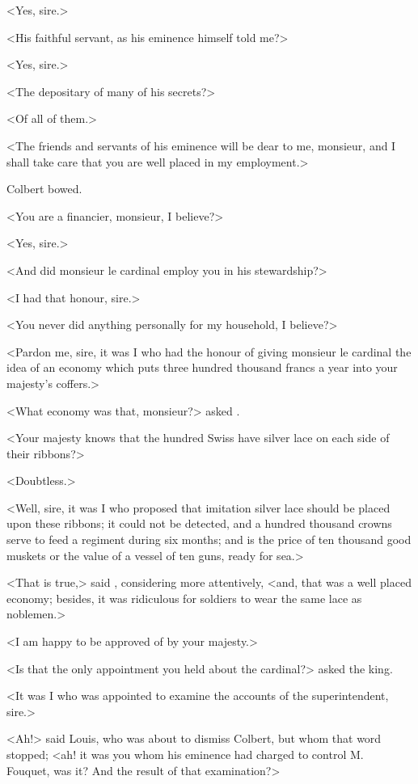 <Yes, sire.>

<His faithful servant, as his eminence himself told me?>

<Yes, sire.>

<The depositary of many of his secrets?>

<Of all of them.>

<The friends and servants of his eminence will be dear to me, monsieur, and I shall take care that you are well placed in my employment.>

Colbert bowed.

<You are a financier, monsieur, I believe?>

<Yes, sire.>

<And did monsieur le cardinal employ you in his stewardship?>

<I had that honour, sire.>

<You never did anything personally for my household, I believe?>

<Pardon me, sire, it was I who had the honour of giving monsieur le cardinal the idea of an economy which puts three hundred thousand francs a year into your majesty's coffers.>

<What economy was that, monsieur?> asked .

<Your majesty knows that the hundred Swiss have silver lace on each side of their ribbons?>

<Doubtless.>

<Well, sire, it was I who proposed that imitation silver lace should be placed upon these ribbons; it could not be detected, and a hundred thousand crowns serve to feed a regiment during six months; and is the price of ten thousand good muskets or the value of a vessel of ten guns, ready for sea.>

<That is true,> said , considering more attentively, <and,  that was a well placed economy; besides, it was ridiculous for soldiers to wear the same lace as noblemen.>

<I am happy to be approved of by your majesty.>

<Is that the only appointment you held about the cardinal?> asked the king.

<It was I who was appointed to examine the accounts of the superintendent, sire.>

<Ah!> said Louis, who was about to dismiss Colbert, but whom that word stopped; <ah! it was you whom his eminence had charged to control M.~ Fouquet, was it? And the result of that examination?>

